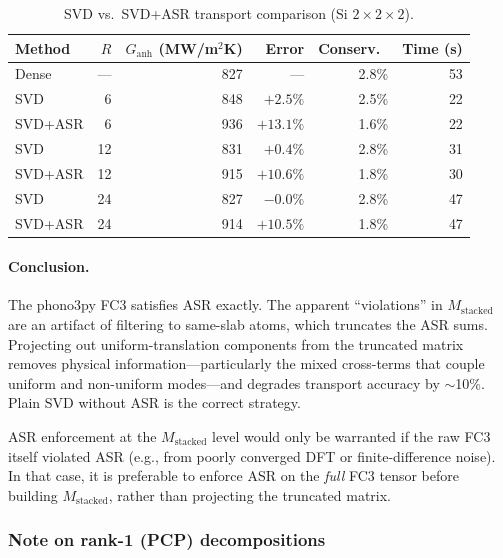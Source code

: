 \begin{table}[h]
  \centering
  \caption{SVD vs.\ SVD+ASR transport comparison (Si $2\!\times\!2\!\times\!2$).}
  \label{tab:svd_asr}
  \begin{tabular}{lrrrrr}
    \toprule
    Method & $R$ & $G_\mathrm{anh}$ (MW/m$^2$K) & Error & Conserv.\ & Time (s) \\
    \midrule
    Dense  & --- & 827 & --- & 2.8\% & 53 \\
    \midrule
    SVD    &  6  & 848 & $+2.5\%$  & 2.5\% & 22 \\
    SVD+ASR&  6  & 936 & $+13.1\%$ & 1.6\% & 22 \\
    \midrule
    SVD    & 12  & 831 & $+0.4\%$  & 2.8\% & 31 \\
    SVD+ASR& 12  & 915 & $+10.6\%$ & 1.8\% & 30 \\
    \midrule
    SVD    & 24  & 827 & $-0.0\%$  & 2.8\% & 47 \\
    SVD+ASR& 24  & 914 & $+10.5\%$ & 1.8\% & 47 \\
    \bottomrule
  \end{tabular}
\end{table}

\paragraph{Conclusion.}
The phono3py FC3 satisfies ASR exactly.  The apparent ``violations''
in $M_\mathrm{stacked}$ are an artifact of filtering to same-slab
atoms, which truncates the ASR sums.  Projecting out
uniform-translation components from the truncated matrix removes
physical information---particularly the mixed cross-terms that couple
uniform and non-uniform modes---and degrades transport accuracy by
$\sim$10\%.  Plain SVD without ASR is the correct strategy.

ASR enforcement at the $M_\mathrm{stacked}$ level would only be
warranted if the raw FC3 itself violated ASR (e.g., from poorly
converged DFT or finite-difference noise).  In that case, it is
preferable to enforce ASR on the \emph{full} FC3 tensor before
building $M_\mathrm{stacked}$, rather than projecting the truncated
matrix.


\subsubsection{Note on rank-1 (PCP) decompositions}
\label{sssub:pcp_note}

